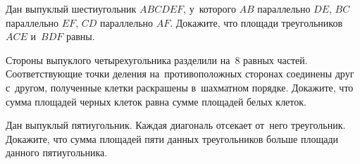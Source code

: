 \begin{problems}
\item
Дан выпуклый шестиугольник $ABCDEF$, у~которого $AB$ параллельно $DE$, $BC$
параллельно $EF$, $CD$ параллельно $AF$.
Докажите, что площади треугольников $ACE$ и~$BDF$ равны.

\item
Стороны выпуклого четырехугольника разделили на~8 равных частей.
Соответствующие точки деления на~противоположных сторонах соединены друг
с~другом, полученные клетки раскрашены в~шахматном порядке.
Докажите, что сумма площадей черных клеток равна сумме площадей белых клеток.

\item
Дан выпуклый пятиугольник.
Каждая диагональ отсекает от~него треугольник.
Докажите, что сумма площадей пяти данных треугольников больше площади данного
пятиугольника.

\end{problems}

